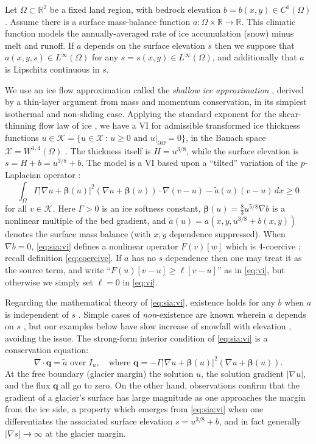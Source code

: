 \documentclass[]{interact}
\theoremstyle{plain}%
\theoremstyle{definition}
\theoremstyle{remark}
\newcommand{\RR}{\mathbb{R}}
\newcommand{\grad}{\nabla}
\newcommand{\Div}{\nabla\cdot}
\newcommand{\bq}{\mathbf{q}}
\newcommand{\cK}{\mathcal{K}}
\newcommand{\cX}{\mathcal{X}}
\begin{document}
Let $\Omega \subset \RR^2$ be a fixed land region, with bedrock elevation $b=b(x,y) \in C^1(\Omega)$.  Assume there is a surface mass-balance \cite{GreveBlatter2009} function $a:\Omega \times \RR \to \RR$.  This climatic function models the annually-averaged rate of ice accumulation (snow) minus melt and runoff.  If $a$ depends on the surface elevation $s$ then we suppose that $a(x,y,s)\in L^\infty(\Omega)$ for any $s=s(x,y) \in L^\infty(\Omega)$, and additionally that $a$ is Lipschitz continuous in $s$.

We use an ice flow approximation called the \emph{shallow ice approximation} \cite{GreveBlatter2009}, derived by a thin-layer argument from mass and momentum conservation, in its simplest isothermal and non-sliding case.  Applying the standard exponent for the shear-thinning flow law of ice \cite{GreveBlatter2009}, we have a VI for admissible transformed ice thickness functions $u \in \cK = \{u \in \cX\,:\,u\ge 0 \text{ and } u|_{\partial\Omega}=0\}$, in the Banach space $\cX = W^{1,4}(\Omega)$ \cite{JouvetBueler2012}.  The thickness itself is $H=u^{3/8}$, while the surface elevation is $s=H+b=u^{3/8}+b$.  The model is a VI based upon a ``tilted'' variation of the $p$-Laplacian operator \cite{JouvetBueler2012}:
\begin{equation}
\int_\Omega \Gamma |\grad u + \bm{\beta}(u)|^2 (\grad u + \bm{\beta}(u)) \cdot \grad (v-u) - \tilde a(u) (v-u)\,dx \ge 0 \label{eq:sia:vi}
\end{equation}
for all $v \in \cK$.  Here $\Gamma>0$ is an ice softness constant, $\bm{\beta}(u)=\frac{8}{3} u^{5/8} \grad b$ is a nonlinear multiple of the bed gradient, and $\tilde a(u)=a(x,y,u^{3/8}+b(x,y))$ denotes the surface mass balance (with $x,y$ dependence suppressed).  When $\grad b=0$, \eqref{eq:sia:vi} defines a nonlinear operator $F(v)[w]$ which is $4$-coercive \cite{JouvetBueler2012}; recall definition \eqref{eq:coercive}.  If $a$ has no $s$ dependence then one may treat it as the source term, and write ``$F(u)[v-u]\ge\ell[v-u]$'' as in \eqref{eq:vi}, but otherwise we simply set $\ell=0$ in \eqref{eq:vi}.

Regarding the mathematical theory of \eqref{eq:sia:vi}, existence holds for any $b$ when $a$ is independent of $s$ \cite{JouvetBueler2012}.  Simple cases of \emph{non}-existence are known wherein $a$ depends on $s$ \cite{Jouvetetal2011}, but our examples below have slow increase of snowfall with elevation \cite{GreveBlatter2009}, avoiding the issue.  The strong-form interior condition of \eqref{eq:sia:vi} is a conservation equation:
\begin{equation}
\Div \bq = \tilde a \text{ over } I_u, \quad \text{where } \bq = - \Gamma |\grad u + \bm{\beta}(u)|^2 (\grad u + \bm{\beta}(u)).
\label{eq:sia:interior}
\end{equation}
At the free boundary (glacier margin) the solution $u$, the solution gradient $|\grad u|$, and the flux $\bq$ all go to zero.  On the other hand, observations confirm that the gradient of a glacier's surface has large magnitude as one approaches the margin from the ice side, a property which emerges from \eqref{eq:sia:vi} when one differentiates the associated surface elevation $s=u^{3/8} + b$, and in fact generally $|\grad s| \to \infty$ at the glacier margin.
\end{document}
